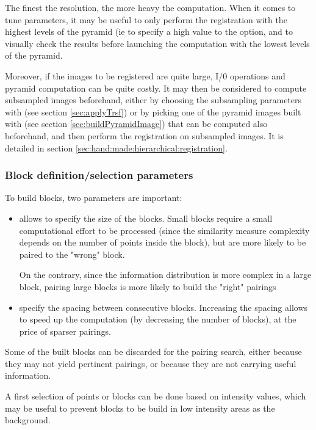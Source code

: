 The finest the resolution, the more heavy the computation. When it comes to tune parameters, it may be useful to only perform the registration with the highest levels of the pyramid (ie to specify a high value to the  option, and to visually check the results before launching the computation with the lowest levels of the pyramid.

Moreover, if the images to be registered are quite large, I/0 operations and pyramid computation can be quite costly. It may then be considered to compute subsampled images beforehand, either by choosing the subsampling parameters with \applyTrsf (see section \ref{sec:applyTrsf}) or by picking one of the pyramid images built with \buildPyramidImage (see section \ref{sec:buildPyramidImage}) that can be computed also beforehand, and then perform the registration on subsampled images. It is detailed in section \ref{sec:hand:made:hierarchical:registration}.





\subsubsection{Block definition/selection parameters}
\label{sec:parameters:block:definition}


To build blocks, two parameters are important:
\begin{itemize}
\item[]  allows to specify the size of the blocks. Small blocks require a small computational effort to be processed (since the similarity measure complexity depends on the number of points inside the block), but are more likely to be paired to the "wrong" block. 

On the contrary, since the information distribution is more complex in a large block, pairing large blocks is more likely to build the "right" pairings
\item[]  specify the spacing between consecutive blocks. Increasing the spacing allows to speed up the computation (by decreasing the number of blocks), at the price of sparser pairings. 
\end{itemize}

Some of the built blocks can be discarded for the pairing search, either because they may not yield pertinent pairings, or because they are not carrying useful information.

A first selection of points or blocks can be done based on intensity values, which may be useful to prevent blocks to be build in low intensity areas as the background.

